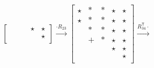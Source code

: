 \documentclass[a4paper,10pt]{article}
\theoremstyle{definition}
\newcommand{\T}{\mathsf{T}\!}
\begin{document}
\[\begin{bmatrix}
        &       &       & \star & \star \\
        &       &       &       & \star \\
\end{bmatrix}
\xrightarrow{\cdot R_{23}}
\begin{bmatrix}
  \star & * & *     & \star & \star \\
  \star & * & *     & \star & \star \\
        & * & *     & \star & \star \\
        & + & *     & \star & \star \\
        &   &       & \star & \star \\
        &   &       &       & \star \\
\end{bmatrix}
\xrightarrow{R_{34}^\T\cdot}
\]
\end{document}
